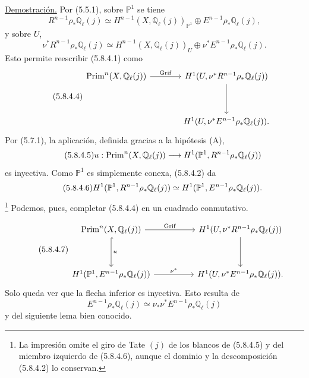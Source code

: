 \noindent\underline{Demostración.}
Por (5.5.1), sobre $\mathbb P^1$ se tiene
\begin{equation}\tag{5.8.4.2}
R^{n-1}\rho_*\mathbb Q_\ell(j)
\simeq
H^{n-1}(X,\mathbb Q_\ell(j))_{\mathbb P^1}
\oplus E^{n-1}\rho_*\mathbb Q_\ell(j),
\end{equation}
y sobre $U$,
\begin{equation}\tag{5.8.4.3}
\nu^*R^{n-1}\rho_*\mathbb Q_\ell(j)
\simeq
H^{n-1}(X,\mathbb Q_\ell(j))_U
\oplus \nu^*E^{n-1}\rho_*\mathbb Q_\ell(j).
\end{equation}
Esto permite reescribir (5.8.4.1) como
\begin{equation}\tag{5.8.4.4}
\begin{tikzcd}[row sep=huge,column sep=large]
\operatorname{Prim}^n(X,\mathbb Q_\ell(j))
  \arrow[r,"\operatorname{Grif}"]
&
H^1(U,\nu^*R^{n-1}\rho_*\mathbb Q_\ell(j))
  \arrow[d]
\\
{}
&
H^1(U,\nu^*E^{n-1}\rho_*\mathbb Q_\ell(j)).
\end{tikzcd}
\end{equation}
Por (5.7.1), la aplicación, definida gracias a la hipótesis (A),
\begin{equation}\tag{5.8.4.5}
u:\operatorname{Prim}^n(X,\mathbb Q_\ell(j))
\longrightarrow
H^1(\mathbb P^1,R^{n-1}\rho_*\mathbb Q_\ell(j))
\end{equation}
es inyectiva. Como $\mathbb P^1$ es simplemente conexa, (5.8.4.2) da
\begin{equation}\tag{5.8.4.6}
H^1(\mathbb P^1,R^{n-1}\rho_*\mathbb Q_\ell(j))
\simeq
H^1(\mathbb P^1,E^{n-1}\rho_*\mathbb Q_\ell(j)).
\end{equation}
\footnote{La impresión omite el giro de Tate $(j)$ de los blancos de
(5.8.4.5) y del miembro izquierdo de (5.8.4.6), aunque el dominio y
la descomposición (5.8.4.2) lo conservan.}
Podemos, pues, completar (5.8.4.4) en un cuadrado conmutativo.

\pageoriginale

\begin{equation}\tag{5.8.4.7}
\begin{tikzcd}[column sep=huge,row sep=huge]
\operatorname{Prim}^n(X,\mathbb Q_\ell(j))
  \arrow[r,"\operatorname{Grif}"]
  \arrow[d,hook,"u"]
&
H^1(U,\nu^*R^{n-1}\rho_*\mathbb Q_\ell(j))
  \arrow[d]
\\
H^1(\mathbb P^1,E^{n-1}\rho_*\mathbb Q_\ell(j))
  \arrow[r,"\nu^*"]
&
H^1(U,\nu^*E^{n-1}\rho_*\mathbb Q_\ell(j)).
\end{tikzcd}
\end{equation}
Solo queda ver que la flecha inferior es inyectiva. Esto resulta de
\begin{equation}\tag{5.8.4.8}
E^{n-1}\rho_*\mathbb Q_\ell(j)
\simeq
\nu_*\nu^*E^{n-1}\rho_*\mathbb Q_\ell(j)
\end{equation}
y del siguiente lema bien conocido.

